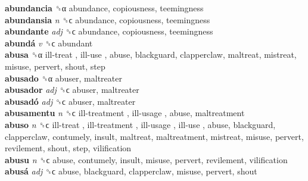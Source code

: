 \textbf{abundancia} ␝α  abundance, copiousness, teemingness  \\
\textbf{abundansia} \emph{n}  ␝ϲ  abundance, copiousness, teemingness  \\
\textbf{abundante} \emph{adj}  ␝ϲ  abundance, copiousness, teemingness  \\
\textbf{abundá} \emph{v}  ␝ϲ  abundant  \\
\textbf{abusa} ␝α   ill-treat ,  ill-use , abuse, blackguard, clapperclaw, maltreat, mistreat, misuse, pervert, shout, step  \\
\textbf{abusado} ␝α  abuser, maltreater  \\
\textbf{abusador} \emph{adj}  ␝ϲ  abuser, maltreater  \\
\textbf{abusadó} \emph{adj}  ␝ϲ  abuser, maltreater  \\
\textbf{abusamentu} \emph{n}  ␝ϲ   ill-treatment ,  ill-usage , abuse, maltreatment  \\
\textbf{abuso} \emph{n}  ␝ϲ   ill-treat ,  ill-treatment ,  ill-usage ,  ill-use , abuse, blackguard, clapperclaw, contumely, insult, maltreat, maltreatment, mistreat, misuse, pervert, revilement, shout, step, vilification  \\
\textbf{abusu} \emph{n}  ␝ϲ  abuse, contumely, insult, misuse, pervert, revilement, vilification  \\
\textbf{abusá} \emph{adj}  ␝ϲ  abuse, blackguard, clapperclaw, misuse, pervert, shout  \\
